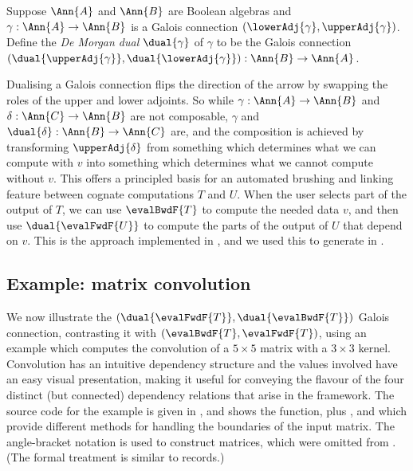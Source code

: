 \begin{definition}
   Suppose $\Ann{A}$ and $\Ann{B}$ are Boolean algebras and $\gamma: \Ann{A} \to \Ann{B}$ is a Galois connection $(\lowerAdj{\gamma},\upperAdj{\gamma})$. Define the \emph{De Morgan dual} $\dual{\gamma}$ of $\gamma$ to be the Galois connection $(\dual{\upperAdj{\gamma}}, \dual{\lowerAdj{\gamma}}): \Ann{B} \to \Ann{A}$.
\end{definition}

\noindent Dualising a Galois connection flips the direction of the arrow by swapping the roles of the upper and lower adjoints. So while $\gamma: \Ann{A} \to \Ann{B}$ and $\delta: \Ann{C} \to \Ann{B}$ are not composable, $\gamma$ and $\dual{\delta}: \Ann{B} \to \Ann{C}$ are, and the composition is achieved by transforming $\upperAdj{\delta}$ from something which determines what we can compute with $v$ into something which determines what we cannot compute without $v$. This offers a principled basis for an automated brushing and linking feature between cognate computations $T$ and $U$. When the user selects part of the output of $T$, we can use $\evalBwdF{T}$ to compute the needed data $v$, and then use $\dual{\evalFwdF{U}}$ to compute the parts of the output of $U$ that depend on $v$. This is the approach implemented in \OurLanguage, and we used this to generate  in .

\subsection{Example: matrix convolution}
\label{sec:de-morgan:example}

We now illustrate the $(\dual{\evalFwdF{T}}, \dual{\evalBwdF{T}})$ Galois connection, contrasting it with $(\evalBwdF{T}, \evalFwdF{T})$, using an example which computes the convolution of a $5 \times 5$ matrix with a $3 \times 3$ kernel. Convolution has an intuitive dependency structure and the values involved have an easy visual presentation, making it useful for conveying the flavour of the four distinct (but connected) dependency relations that arise in the framework. The source code for the example is given in , and shows the  function, plus ,  and  which provide different methods for handling the boundaries of the input matrix. The angle-bracket notation is used to construct matrices, which were omitted from . (The formal treatment is similar to records.)

